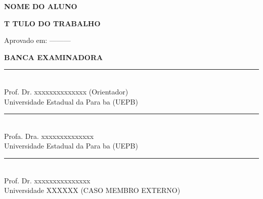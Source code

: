 \documentclass{article}
\begin{document}

\thispagestyle{empty}
\begin{center}
\textbf{NOME DO ALUNO}

\vspace{1cm}

\textbf{T TULO DO TRABALHO}

\end{center}

\vspace{.4cm}
\begin{flushright}
\parbox{8cm}{
}
\end{flushright}

\vspace{.6cm}

\noindent Aprovado em: ---------

\vspace{1.5cm}

\begin{center}
\textbf{BANCA EXAMINADORA}
\vspace{1.5cm}

\noindent\rule{12cm}{0.4pt} \\
Prof. Dr. xxxxxxxxxxxxxx (Orientador)\\
Universidade Estadual da Para ba (UEPB)
\vspace{2cm}

\noindent\rule{12cm}{0.4pt}\\
Profa. Dra. xxxxxxxxxxxxxx  \\
Universidade Estadual da Para ba (UEPB)
\vspace{2cm}

\noindent\rule{12cm}{0.4pt}\\
Prof. Dr. xxxxxxxxxxxxxxx \\
Universidade XXXXXX (CASO MEMBRO EXTERNO)
\vspace{2cm}

\end{center}

\end{document}
